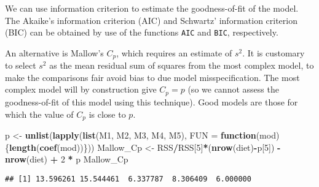 \documentclass[]{book}
\newenvironment{Shaded}{\begin{snugshade}}{\end{snugshade}}
\newcommand{\CommentTok}[1]{\textcolor[rgb]{0.56,0.35,0.01}{\textit{#1}}}
\newcommand{\ControlFlowTok}[1]{\textcolor[rgb]{0.13,0.29,0.53}{\textbf{#1}}}
\newcommand{\DataTypeTok}[1]{\textcolor[rgb]{0.13,0.29,0.53}{#1}}
\newcommand{\DecValTok}[1]{\textcolor[rgb]{0.00,0.00,0.81}{#1}}
\newcommand{\KeywordTok}[1]{\textcolor[rgb]{0.13,0.29,0.53}{\textbf{#1}}}
\newcommand{\NormalTok}[1]{#1}
\newcommand{\OperatorTok}[1]{\textcolor[rgb]{0.81,0.36,0.00}{\textbf{#1}}}
\newcommand{\StringTok}[1]{\textcolor[rgb]{0.31,0.60,0.02}{#1}}
\theoremstyle{definition}
\theoremstyle{definition}
\theoremstyle{definition}
\theoremstyle{remark}
\begin{document}
We can use information criterion to estimate the goodness-of-fit of the model.
The Akaike's information criterion (AIC) and Schwartz' information criterion (BIC) can be obtained by use of the functions \texttt{AIC} and \texttt{BIC}, respectively.

An alternative is Mallow's \(C_p\), which requires an estimate of \(s^2\). It is customary to select \(s^2\) as the mean residual sum of squares from the most complex model, to make the comparisons fair avoid bias to due model misspecification.
The most complex model will by construction give \(C_p=p\) (so we cannot assess the goodness-of-fit of this model using this technique). Good models are those for which the value of \(C_p\) is close to \(p\).

\begin{Shaded}
\begin{Highlighting}[]
\NormalTok{p <-}\StringTok{ }\KeywordTok{unlist}\NormalTok{(}\KeywordTok{lapply}\NormalTok{(}\KeywordTok{list}\NormalTok{(M1, M2, M3, M4, M5), }
                   \DataTypeTok{FUN =} \ControlFlowTok{function}\NormalTok{(mod)\{}\KeywordTok{length}\NormalTok{(}\KeywordTok{coef}\NormalTok{(mod))\}))}
\NormalTok{Mallow_Cp <-}\StringTok{ }\NormalTok{RSS}\OperatorTok{/}\NormalTok{RSS[}\DecValTok{5}\NormalTok{]}\OperatorTok{*}\NormalTok{(}\KeywordTok{nrow}\NormalTok{(diet)}\OperatorTok{-}\NormalTok{p[}\DecValTok{5}\NormalTok{]) }\OperatorTok{-}\StringTok{ }\KeywordTok{nrow}\NormalTok{(diet) }\OperatorTok{+}\StringTok{ }\DecValTok{2} \OperatorTok{*}\StringTok{ }\NormalTok{p}
\NormalTok{Mallow_Cp}
\end{Highlighting}
\end{Shaded}

\begin{verbatim}
## [1] 13.596261 15.544461  6.337787  8.306409  6.000000
\end{verbatim}

\begin{Shaded}
\end{Shaded}
\end{document}
